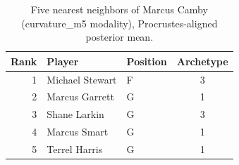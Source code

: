\begin{table}[htbp]
  \centering\small
  \begin{tabular}{rllc}
    \toprule
    Rank & Player & Position & Archetype \\
    \midrule
    1 & Michael Stewart & F & 3 \\
    2 & Marcus Garrett & G & 1 \\
    3 & Shane Larkin & G & 3 \\
    4 & Marcus Smart & G & 1 \\
    5 & Terrel Harris & G & 1 \\
    \bottomrule
  \end{tabular}
  \caption{Five nearest neighbors of Marcus Camby (curvature_m5 modality), Procrustes-aligned posterior mean.}
  \label{tab:Marcus_Camby_neighbors_curvature_m5}
\end{table}

